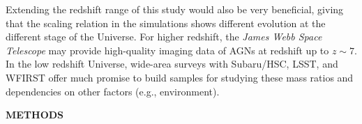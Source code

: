 \documentclass{natureprintstyle}
\newcommand{\mbh}{$\mathcal M_{\rm BH}$}
\newcommand{\lhost}{$L_{\rm host}$}
\newcommand{\mstar}{{$M_*$}}
\begin{document}
Extending the redshift range of this study would also be very beneficial, giving that the scaling relation in the simulations shows different evolution at the different stage of the Universe. For higher redshift, the {\it James Webb Space Telescope} may provide high-quality imaging data of AGNs at redshift up to $z\sim7$. In the low redshift Universe, wide-area surveys with Subaru/HSC, LSST, and WFIRST offer much promise to build samples for studying these mass ratios and dependencies on other factors (e.g., environment).





\begin{center}
{\bf \Large \uppercase{Methods} }
\end{center}
\end{document}
